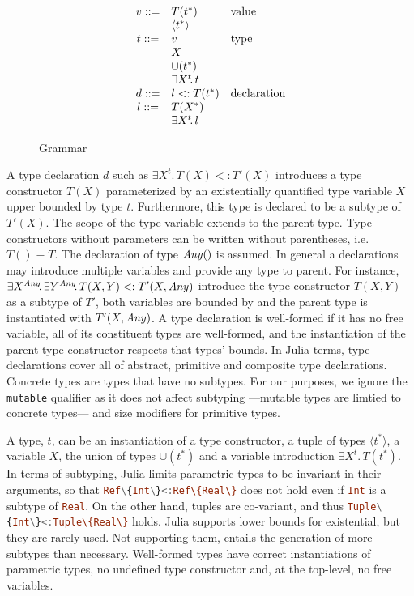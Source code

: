 \documentclass{paper}
\renewcommand{\c}{\cjl}
\newcommand{\cjl}[1]{{\small\lstinline[language=Julia]!#1!}\xspace}
\newcommand{\EM}[1]{\ensuremath{#1}\xspace}    %
\newcommand{\Exist}[2]{\EM{\exists #1\!.\,#2}}       %
\newcommand{\Tuple}[1]{\EM{\langle #1 \rangle}}      %
\newcommand{\Union}[1]{\EM{\cup(#1)}}                %
\newcommand{\m}[1]{\EM{{#1^{*}}}}                     %
\renewcommand{\t}{\EM{t}}                            %
\newcommand{\mt}{\EM{\m{\t}}}                        %
\newcommand{\X}{\EM{X}}                              %
\newcommand{\Y}{\EM{Y}}                              %
\newcommand{\Xt}{\EM{\X^\t}}                         %
\newcommand{\Ty}[2]{\EM{#1(#2)}}                     %
\newcommand{\T}{\EM{T}}                              %
\newcommand{\TyT}[1]{\EM{\Ty \T{#1}}}                %
\newcommand{\TyTt}{\EM{\TyT{\mt}}}                   %
\newcommand{\TyTX}{\EM{\TyT{\m\X}}}                  %
\renewcommand{\v}{\EM{v}}                            %
\renewcommand{\d}{\EM{d}}                            %
\renewcommand{\l}{\EM{l}}                            %
\begin{document}
\begin{figure}[!h]
\[\begin{array}{cl@{\quad}ll}
\v   ::= & \TyTt            & \text{value} \\
         & \Tuple\mt        & \text{} \\
\t   ::= & \v               & \text{type} \\
         & \X               & \text{} \\
         & \Union\mt        & \text{} \\          
         & \Exist \Xt \t    & \text{} \\
\d ::=   & \l <: \TyTt      & \text{declaration}\\
\l ::=   & \TyTX            & \text{} \\
         & \Exist \Xt\l     & \\
 \end{array}\]
\caption{Grammar}\label{g}
\end{figure}

A type declaration \d such as $\Exist\Xt{\TyT\X} <: \Ty{\T'}\X$
introduces a type constructor \TyT\X parameterized by an existentially
quantified type variable \X upper bounded by type \t. Furthermore,
this type is declared to be a subtype of \Ty{\T'}\X. The scope of the
type variable extends to the parent type. Type constructors without
parameters can be written without parentheses, i.e. $\TyT{} \equiv
\T$. The declaration of type \Ty{\Any}{} is assumed.  In general a
declarations may introduce multiple variables and provide any type to
parent. For instance,
$\Exist{\X^\Any}{\Exist{\Y^\Any}{\TyT{\X,\Y}}}<:\Ty{\T'}{\X,\Any}$
introduce the type constructor \TyT{\X,\Y} as a subtype of $\T'$, both
variables are bounded by \Any and the parent type is instantiated with
\Ty{\T'}{\X,\Any}. A type declaration is well-formed if it has no free
variable, all of its constituent types are well-formed, and the
instantiation of the parent type constructor respects that types'
bounds. In Julia terms, type declarations cover all of abstract,
primitive and composite type declarations. Concrete types are types
that have no subtypes. For our purposes, we ignore the \c{mutable}
qualifier as it does not affect subtyping ---mutable types are limtied
to concrete types--- and size modifiers for primitive types.

A type, \t, can be an instantiation of a type constructor, a tuple of
types \Tuple\mt, a variable \X, the union of types \Union\mt and a
variable introduction \Exist\Xt\TyTt.  In terms of subtyping, Julia
limits parametric types to be invariant in their arguments, so that
\c{Ref\{Int\}<:Ref\{Real\}} does not hold even if \c{Int} is a subtype
of \c{Real}. On the other hand, tuples are co-variant, and thus
\c{Tuple\{Int\}<:Tuple\{Real\}} holds. Julia supports lower bounds for
existential, but they are rarely used. Not supporting them, entails
the generation of more subtypes than necessary. Well-formed types have
correct instantiations of parametric types, no undefined type
constructor and, at the top-level, no free variables.
\end{document}
